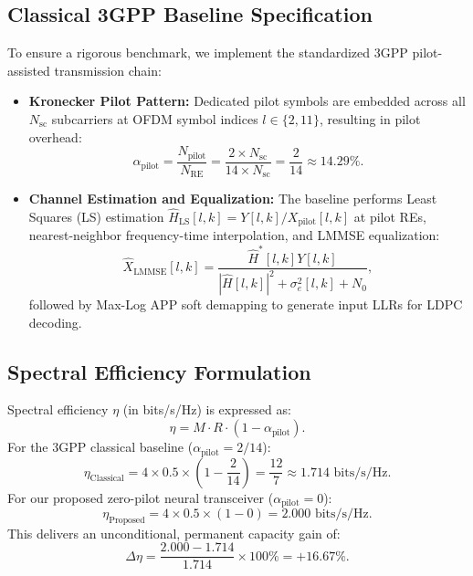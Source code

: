 \documentclass[journal]{IEEEtran}
\begin{document}
\subsection{Classical 3GPP Baseline Specification}
To ensure a rigorous benchmark, we implement the standardized 3GPP pilot-assisted transmission chain:
\begin{itemize}
    \item \textbf{Kronecker Pilot Pattern:} Dedicated pilot symbols are embedded across all $N_{\text{sc}}$ subcarriers at OFDM symbol indices $l \in \{2, 11\}$, resulting in pilot overhead:
    \begin{equation}
        \alpha_{\text{pilot}} = \frac{N_{\text{pilot}}}{N_{\text{RE}}} = \frac{2 \times N_{\text{sc}}}{14 \times N_{\text{sc}}} = \frac{2}{14} \approx 14.29\%.
    \end{equation}
    \item \textbf{Channel Estimation and Equalization:} The baseline performs Least Squares (LS) estimation $\hat{H}_{\text{LS}}[l, k] = Y[l, k]/X_{\text{pilot}}[l, k]$ at pilot REs, nearest-neighbor frequency-time interpolation, and LMMSE equalization:
    \begin{equation}
        \hat{X}_{\text{LMMSE}}[l, k] = \frac{\hat{H}^*[l, k] Y[l, k]}{|\hat{H}[l, k]|^2 + \sigma_e^2[l, k] + N_0},
    \end{equation}
    followed by Max-Log APP soft demapping to generate input LLRs for LDPC decoding.
\end{itemize}

\subsection{Spectral Efficiency Formulation}
Spectral efficiency $\eta$ (in bits/s/Hz) is expressed as:
\begin{equation}
    \eta = M \cdot R \cdot (1 - \alpha_{\text{pilot}}).
\end{equation}
For the 3GPP classical baseline ($\alpha_{\text{pilot}} = 2/14$):
\begin{equation}
    \eta_{\text{Classical}} = 4 \times 0.5 \times \left(1 - \frac{2}{14}\right) = \frac{12}{7} \approx 1.714\text{ bits/s/Hz}.
\end{equation}
For our proposed zero-pilot neural transceiver ($\alpha_{\text{pilot}} = 0$):
\begin{equation}
    \eta_{\text{Proposed}} = 4 \times 0.5 \times (1 - 0) = 2.000\text{ bits/s/Hz}.
\end{equation}
This delivers an unconditional, permanent capacity gain of:
\begin{equation}
    \Delta \eta = \frac{2.000 - 1.714}{1.714} \times 100\% = +16.67\%.
\end{equation}
\end{document}
